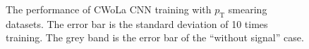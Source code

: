 \documentclass[12pt]{article}
\begin{document}
\begin{figure}[htpb]
{            }
            \caption{The performance of CWoLa CNN training with $p_{\text{T}}$ smearing datasets. The error bar is the standard deviation of 10 times training. The grey band is the error bar of the ``without signal'' case.}
            \label{fig:acc_auc_curve_origin_pt_aug_1_3_5_res_25_75}
        \end{figure}
\end{document}
